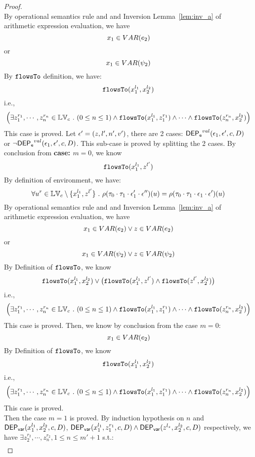 \begin{proof}
\[\]
By operational semantics rule  and  and {Inversion Lemma~\ref{lem:inv_a}} of arithmetic expression evaluation, we have 
\[
  x_1 \in VAR(e_2) 
\]
or
\[
  x_1 \in VAR(\psi_2)
\]
%
By $\mathtt{flowsTo}$ definition, we have:
%
\[
\mathtt{flowsTo}(x_1^{l_1}, {x}_2^{l_2})
\]
i.e.,
%
\[
\Big(\exists z_1^{r_1}, \cdots, z_n^{r_n} \in \mathbb{LV}_{{c}} ~.~ (0 \leq n \leq 1 )
 \land \mathtt{flowsTo}(x_1^{l_1}, z_1^{r_1}) \land \cdots \land \mathtt{flowsTo}(z_n^{r_n}, {x}_2^{l_2}) \Big)
\]
%
This case is proved.
%
%
Let $\mathtt{\epsilon}' = (z, l', n', v')$, there are 2 cases:
%
$\mathsf{DEP_{\mathtt{e}}}^{val}(\mathtt{\epsilon}_1, \mathtt{\epsilon}', c, D)$ or $\neg \mathsf{DEP_{\mathtt{e}}}^{val}(\mathtt{\epsilon}_1, \mathtt{\epsilon}', c, D)$.
%
This sub-case is proved by splitting the 2 cases.
%
%
By conclusion from \textbf{case: $m = 0$}, we know
\[
  \mathtt{flowsTo}(x_1^{l_1}, z^{l'})
\]
%
By definition of environment, we have:
\[
  \forall u^r \in \mathbb{LV}_c \setminus \{x_1^{l_1}, z^{l'}\} ~.~
  \rho(\mathtt{\tau}_0 \cdot \mathtt{\tau}_1 \cdot \mathtt{\epsilon}_1' \cdot \mathtt{\epsilon}'') (u) =  
  \rho(\mathtt{\tau}_0 \cdot \mathtt{\tau}_1 \cdot \mathtt{\epsilon}_1 \cdot \mathtt{\epsilon}') (u)
\]
By operational semantics rule  and  and {Inversion Lemma~\ref{lem:inv_a}} of arithmetic expression evaluation, we have 
\[
  x_1 \in VAR(e_2) \lor z \in VAR(e_2)
\]
or
\[
  x_1 \in VAR(\psi_2) \lor z \in VAR(\psi_2)
\]
%
By Definition of $\mathtt{flowsTo}$, we know
\[
  \mathtt{flowsTo}(x_1^{l_1}, x_2^{l_2}) \lor 
  \big(\mathtt{flowsTo}(x_1^{l_1}, z^{l'}) \land \mathtt{flowsTo}(z^{l'}, x_2^{l_2}) \big)
\]
%
i.e.,
%
\[
\Big(\exists z_1^{r_1}, \cdots, z_n^{r_n} \in \mathbb{LV}_{{c}} ~.~ (0 \leq n \leq 1 )
 \land \mathtt{flowsTo}(x_1^{l_1}, z_1^{r_1}) \land \cdots \land \mathtt{flowsTo}(z_n^{r_n}, {x}_2^{l_2}) \Big)
\]
%
This case is proved.
%
Then, we know by conclusion from the case $m = 0$:
\[
  x_1 \in VAR(e_2)
\]
%
By Definition of $\mathtt{flowsTo}$, we know
\[
  \mathtt{flowsTo}(x_1^{l_1}, x_2^{l_2}) 
\]
%
i.e.,
%
\[
\Big(\exists z_1^{r_1}, \cdots, z_n^{r_n} \in \mathbb{LV}_{{c}} ~.~ (0 \leq n \leq 1 )
 \land \mathtt{flowsTo}(x_1^{l_1}, z_1^{r_1}) \land \cdots \land \mathtt{flowsTo}(z_n^{r_n}, {x}_2^{l_2}) \Big)
\]
This case is proved.
%
\\
Then the case $m = 1$ is proved.
%
By induction hypothesis on $n$ and $\mathsf{DEP_{var}}(x_1^{l_1}, x_2^{l_2}, c, D)$, 
$\mathsf{DEP_{var}}(x_1^{l_1}, z_1^{r_1}, c, D) \land \mathsf{DEP_{var}}(z^{l_z}, x_2^{l_2}, c, D)$ respectively, 
we have $\exists z_2^{r_2}, \cdots, z_n^{r_2}, 1 \leq n \leq m'+1$ s.t.:
\[
\begin{array}{ll}

\end{array}\]
\end{proof}
